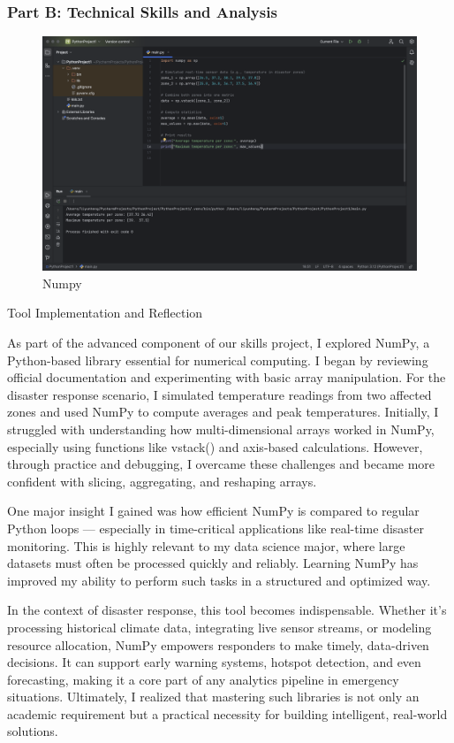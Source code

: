 \documentclass[a4paper, 11pt]{report}
\begin{document}
\subsubsection{Part B: Technical Skills and Analysis}

\begin{figure}[htbp]
\begin{center}
\includegraphics[width=0.95\linewidth]{Numpy.png}
\caption{Numpy}
\end{center}
\end{figure}


Tool Implementation and Reflection

As part of the advanced component of our skills project, I explored NumPy, a Python-based library essential for numerical computing. I began by reviewing official documentation and experimenting with basic array manipulation. For the disaster response scenario, I simulated temperature readings from two affected zones and used NumPy to compute averages and peak temperatures. Initially, I struggled with understanding how multi-dimensional arrays worked in NumPy, especially using functions like vstack() and axis-based calculations. However, through practice and debugging, I overcame these challenges and became more confident with slicing, aggregating, and reshaping arrays.

One major insight I gained was how efficient NumPy is compared to regular Python loops — especially in time-critical applications like real-time disaster monitoring. This is highly relevant to my data science major, where large datasets must often be processed quickly and reliably. Learning NumPy has improved my ability to perform such tasks in a structured and optimized way.

In the context of disaster response, this tool becomes indispensable. Whether it's processing historical climate data, integrating live sensor streams, or modeling resource allocation, NumPy empowers responders to make timely, data-driven decisions. It can support early warning systems, hotspot detection, and even forecasting, making it a core part of any analytics pipeline in emergency situations. Ultimately, I realized that mastering such libraries is not only an academic requirement but a practical necessity for building intelligent, real-world solutions.
\end{document}
